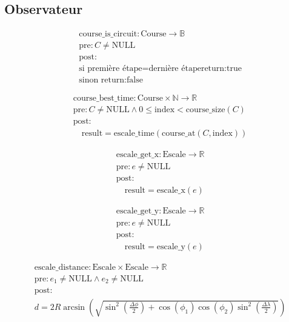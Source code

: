 \subsection{Observateur}



\[
\begin{aligned}
&\text{course\_is\_circuit}: \text{Course} \to \mathbb{B} \\
&\text{pre}: C \neq \text{NULL} \\
&\text{post}: \\
&\text{si } \text{première étape} = \text{dernière étape} \text{return:true} \\
&\text{sinon return:false}
\end{aligned}
\]



\[
\begin{aligned}
&\text{course\_best\_time}: \text{Course} \times \mathbb{N} \to \mathbb{R} \\
&\text{pre}: C \neq \text{NULL} \land 0 \leq \text{index} < \text{course\_size}(C) \\
&\text{post}: \\
&\quad \text{result} = \text{escale\_time}(\text{course\_at}(C, \text{index}))
\end{aligned}
\]



\[
\begin{aligned}
&\text{escale\_get\_x}: \text{Escale} \to \mathbb{R} \\
&\text{pre}: e \neq \text{NULL} \\
&\text{post}: \\
&\quad \text{result} = \text{escale\_x}(e)
\end{aligned}
\]





\[
\begin{aligned}
&\text{escale\_get\_y}: \text{Escale} \to \mathbb{R} \\
&\text{pre}: e \neq \text{NULL} \\
&\text{post}: \\
&\quad \text{result} = \text{escale\_y}(e)
\end{aligned}
\]



\[
\begin{aligned}
&\text{escale\_distance}: \text{Escale} \times \text{Escale} \to \mathbb{R} \\
&\text{pre}: e_1 \neq \text{NULL} \land e_2 \neq \text{NULL} \\
&\text{post}: \\
&d = 2R \arcsin \left( \sqrt{\sin^2 \left(\frac{\Delta \phi}{2}\right) + \cos(\phi_1) \cos(\phi_2) \sin^2 \left(\frac{\Delta \lambda}{2}\right)} \right)
\end{aligned}
\]



